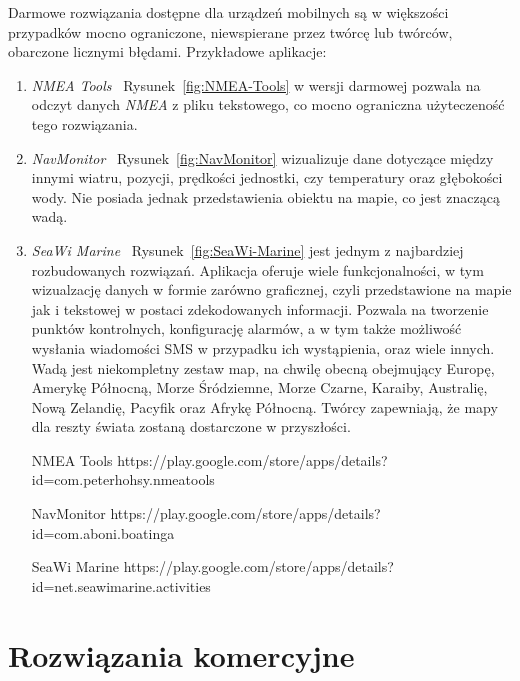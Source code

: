 \documentclass[skorowidz,skroty]{dyplomWEZUT}
\begin{document}
Darmowe rozwiązania dostępne dla urządzeń mobilnych są w większości przypadków mocno ograniczone, niewspierane przez twórcę lub twórców, obarczone licznymi błędami. Przykładowe aplikacje:
\begin{enumerate}

\item \textit{NMEA Tools} \cite{NMEATools} ~Rysunek~\ref{fig:NMEA-Tools} w wersji darmowej pozwala na odczyt danych \textit{NMEA} z pliku tekstowego, co mocno ograniczna użyteczeność tego rozwiązania. 

\item \textit{NavMonitor} \cite{NavMonitor} ~Rysunek~\ref{fig:NavMonitor} wizualizuje dane dotyczące między innymi wiatru, pozycji, prędkości jednostki, czy temperatury oraz głębokości wody. Nie posiada jednak przedstawienia obiektu na mapie, co jest znaczącą wadą. 

\item \textit{SeaWi Marine} \cite{SeaWiMarine} ~Rysunek~\ref{fig:SeaWi-Marine} jest jednym z najbardziej rozbudowanych rozwiązań. Aplikacja oferuje wiele funkcjonalności, w tym wizualzację danych w formie zarówno graficznej, czyli przedstawione na mapie jak i tekstowej w postaci zdekodowanych informacji. Pozwala na tworzenie punktów kontrolnych, konfigurację alarmów, a w tym także możliwość wysłania wiadomości SMS w przypadku ich wystąpienia, oraz wiele innych. Wadą jest niekompletny zestaw map, na chwilę obecną obejmujący Europę, Amerykę Północną, Morze Śródziemne, Morze Czarne, Karaiby, Australię, Nową Zelandię, Pacyfik oraz Afrykę Północną. Twórcy zapewniają, że mapy dla reszty świata zostaną dostarczone w przyszłości.

{NMEA Tools \label{fig:NMEA-Tools}}
{https://play.google.com/store/apps/details?id=com.peterhohsy.nmeatools}

{NavMonitor \label{fig:NavMonitor}}
{https://play.google.com/store/apps/details?id=com.aboni.boatinga}

{SeaWi Marine \label{fig:SeaWi-Marine}}
{https://play.google.com/store/apps/details?id=net.seawimarine.activities}

\end{enumerate}
\newpage
\section{Rozwiązania komercyjne}\label{chap: Commercial solutions}
\end{document}
